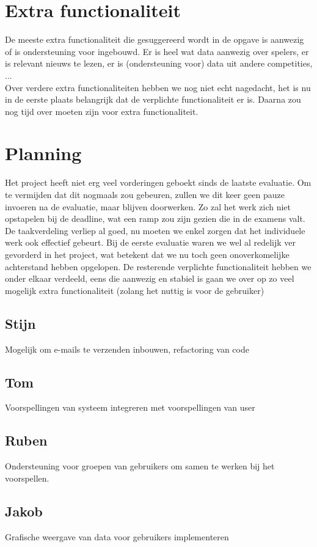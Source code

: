\documentclass[11pt, a4paper]{article}
\begin{document}
\section{Extra functionaliteit}
De meeste extra functionaliteit die gesuggereerd wordt in de opgave is aanwezig of is ondersteuning voor ingebouwd. Er is heel wat data aanwezig over spelers, er is relevant nieuws te lezen, er is (ondersteuning voor) data uit andere competities, ... \\ Over verdere extra functionaliteiten hebben we nog niet echt nagedacht, het is nu in de eerste plaats belangrijk dat de verplichte functionaliteit er is. Daarna zou nog tijd over moeten zijn voor extra functionaliteit.

\section{Planning}
Het project heeft niet erg veel vorderingen geboekt sinds de laatste evaluatie. Om te vermijden dat dit nogmaals zou gebeuren, zullen we dit keer geen pauze invoeren na de evaluatie, maar blijven doorwerken. Zo zal het werk zich niet opstapelen bij de deadline, wat een ramp zou zijn gezien die in de examens valt. De taakverdeling verliep al goed, nu moeten we enkel zorgen dat het individuele werk ook effectief gebeurt. Bij de eerste evaluatie waren we wel al redelijk ver gevorderd in het project, wat betekent dat we nu toch geen onoverkomelijke achterstand hebben opgelopen. De resterende verplichte functionaliteit hebben we onder elkaar verdeeld, eens die aanwezig en stabiel is gaan we over op zo veel mogelijk extra functionaliteit (zolang het nuttig is voor de gebruiker)
\subsection{Stijn}
Mogelijk om e-mails te verzenden inbouwen, refactoring van code
\subsection{Tom}
Voorspellingen van systeem integreren met voorspellingen van user
\subsection{Ruben}
Ondersteuning voor groepen van gebruikers om samen te werken bij het voorspellen.
\subsection{Jakob}
Grafische weergave van data voor gebruikers implementeren
\end{document}
